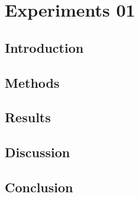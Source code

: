 \chapter{Experiments 01}
\label{chapterlabel}

\blindtext

\section{Introduction}

\section{Methods}

\section{Results}

\section{Discussion}

\section{Conclusion}